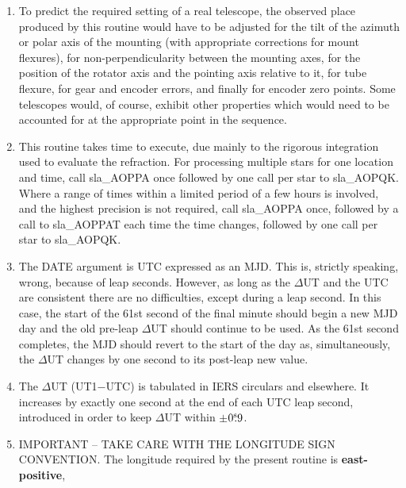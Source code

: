 \documentclass[11pt,twoside]{article}
\newcommand{\tseci}[1]   {$#1$\mbox{$^{\rm s}$}}
\newcommand{\tsec}[2]    {\tseci{#1}$\hspace{-0.3em}.#2$}
\renewcommand{\tsec}[2] {$#1^{\rm s}\hspace{-0.3em}.#2$}
\begin{document}
{\begin{enumerate}
        equatorial located at the observer and with its polar axis
        aligned to the Earth's axis of rotation ({\it n.b.}\ not to the
        refracted pole).  Finally, the $\alpha$ is obtained by subtracting
        the {\it h}\/ from the local apparent ST.
  \item To predict the required setting of a real telescope, the
        observed place produced by this routine would have to be
        adjusted for the tilt of the azimuth or polar axis of the
        mounting (with appropriate corrections for mount flexures),
        for non-perpendicularity between the mounting axes, for the
        position of the rotator axis and the pointing axis relative
        to it, for tube flexure, for gear and encoder errors, and
        finally for encoder zero points.  Some telescopes would, of
        course, exhibit other properties which would need to be
        accounted for at the appropriate point in the sequence.
  \item This routine takes time to execute, due mainly to the
        rigorous integration used to evaluate the refraction.
        For processing multiple stars for one location and time,
        call sla\_AOPPA once followed by one call per star to sla\_AOPQK.
        Where a range of times within a limited period of a few hours
        is involved, and the highest precision is not required, call
        sla\_AOPPA once, followed by a call to sla\_AOPPAT each time the
        time changes, followed by one call per star to sla\_AOPQK.
  \item The DATE argument is UTC expressed as an MJD.  This is,
        strictly speaking, wrong, because of leap seconds.  However,
        as long as the $\Delta$UT and the UTC are consistent there
        are no difficulties, except during a leap second.  In this
        case, the start of the 61st second of the final minute should
        begin a new MJD day and the old pre-leap $\Delta$UT should
        continue to be used.  As the 61st second completes, the MJD
        should revert to the start of the day as, simultaneously,
        the $\Delta$UT changes by one second to its post-leap new value.
  \item The $\Delta$UT (UT1$-$UTC) is tabulated in IERS circulars and
        elsewhere.  It increases by exactly one second at the end of
        each UTC leap second, introduced in order to keep $\Delta$UT
        within $\pm$\tsec{0}{9}.
  \item IMPORTANT -- TAKE CARE WITH THE LONGITUDE SIGN CONVENTION.  The
        longitude required by the present routine is {\bf east-positive},

\end{enumerate}}
\end{document}
